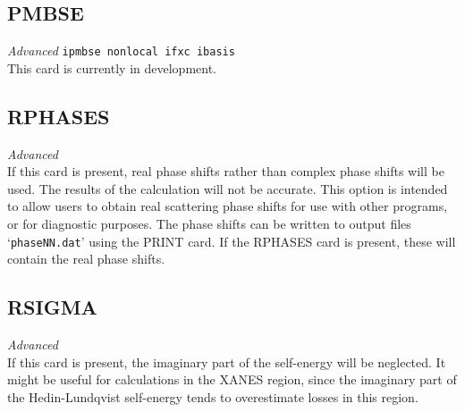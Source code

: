 \documentclass[11pt,oneside]{report} %
\renewcommand{\htmlref}[2]{\hyperlink{#2}{#1}}
\newenvironment{Card}[4]%
      {\vspace{3ex}%
        \subsection{#1}
        \quad\textsl{#3}\newline
        \quad\texttt{#2}\newline%
        \label{card:#4}\\}
      {}
\newcommand{\file}[1]{`\texttt{#1}'}
\renewcommand{\htmlref}[2]{{#1}} %
\begin{document}
 
 
 \begin{Card}{PMBSE}{ipmbse nonlocal ifxc ibasis}{Advanced}{pmb}
  This card is  currently in development.
\end{Card}



\begin{Card}{RPHASES}{}{Advanced}{rph}
  If this card is present, real phase shifts rather than complex phase
  shifts will be used. The results of the calculation will not be
  accurate. This option is intended to allow users to obtain real
  scattering phase shifts for use with other programs, or for
  diagnostic purposes. The phase shifts can be written to output
  files \file{phaseNN.dat} using the \htmlref{PRINT}{card:pri} card. 
  If the RPHASES card is present, these will contain the real phase shifts.
\end{Card}



\begin{Card}{RSIGMA}{}{Advanced}{rsi}
  If this card is present, the imaginary part of the self-energy will be 
  neglected. It might be useful for calculations in the XANES region, since 
  the imaginary part of the Hedin-Lundqvist self-energy tends to overestimate 
  losses in this region.
\end{Card}
\end{document}
